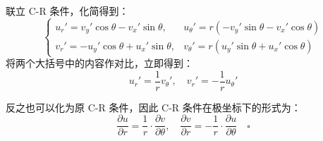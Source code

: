 \documentclass[UTF8]{report}
\theoremstyle{MyLineTheoremStyle} %
\theoremstyle{MyBlockTheoremStyle} %
\theoremstyle{MySubsubsectionStyle} %
\begin{document}
联立 C-R 条件，化简得到：
\begin{equation*}
\begin{cases}
    u_r' = v_y' \cos \theta - v_x' \sin \theta , &u_\theta' = r \left(-v_y'\sin \theta - v_x' \cos \theta\right)\\ 
    v_r' =  -u_y'\cos \theta + u_x' \sin \theta , &v_\theta' = r\left(u_y' \sin \theta + u_x' \cos \theta \right)
\end{cases}
\end{equation*}
将两个大括号中的内容作对比，立即得到：
\begin{equation}
    u_r' = \frac{1}{r}v_\theta',\quad v_r' = -\frac{1}{r}u_\theta'
\end{equation}


反之也可以化为原 C-R 条件，因此 C-R 条件在极坐标下的形式为：
\begin{equation*}
    \frac{\partial u }{\partial r } = \frac{1}{r}\cdot\frac{\partial v }{\partial \theta }, \quad \frac{\partial v }{\partial r } = -\frac{1}{r}\cdot\frac{\partial u }{\partial \theta }\quad \square
\end{equation*}
\end{document}
